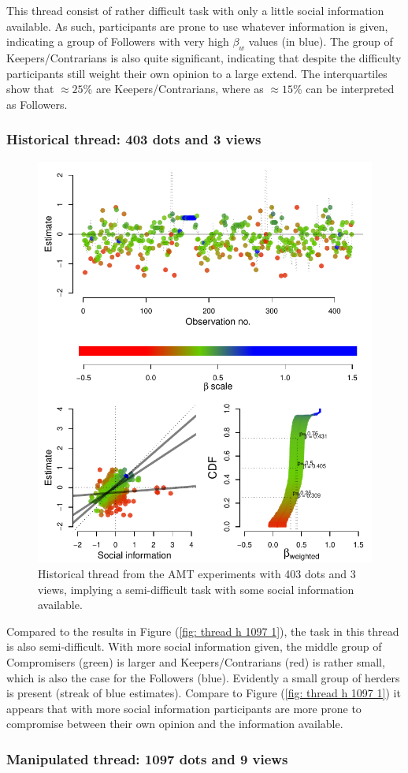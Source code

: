 \documentclass[10pt,a4paper,twocolumn,lineno]{article}
\begin{document}
This thread consist of rather difficult task with only a little social information available. As such, participants are prone to use whatever information is given, indicating a group of Followers with very high $\beta_w$ values (in blue). The group of Keepers/Contrarians is also quite significant, indicating that despite the difficulty participants still weight their own opinion to a large extend. The interquartiles show that  $\approx25\%$ are Keepers/Contrarians, where as $\approx15\%$ can be interpreted as Followers.

\subsubsection{Historical thread: 403 dots and 3 views}

\begin{figure}[htbp]
	\centering\includegraphics[width=.5\textwidth]{../plots/h4033.pdf}
	\caption{Historical thread from the AMT experiments with 403 dots and 3 views, implying a semi-difficult task with some social information available.}\label{fig: thread h 403 3}
\end{figure}

Compared to the results in Figure (\ref{fig: thread h 1097 1}), the task in this thread is also semi-difficult. With more social information given, the middle group of Compromisers (green) is larger and Keepers/Contrarians (red) is rather small, which is also the case for the Followers (blue). Evidently a small group of herders is present (streak of blue estimates). Compare to Figure (\ref{fig: thread h 1097 1}) it appears that with more social information participants are more prone to compromise between their own opinion and the information available.

\subsubsection{Manipulated thread: 1097 dots and 9 views}
\end{document}
